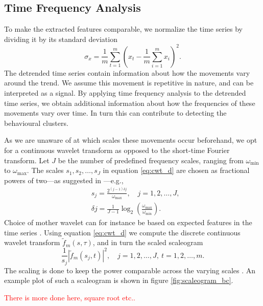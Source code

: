 \documentclass[a4paper]{memoir}
\theoremstyle{plain}
\theoremstyle{definition}
\theoremstyle{remark}
\begin{document}
\subsection{Time Frequency Analysis}
To make the extracted features comparable, we normalize the time series by dividing it by its standard deviation
\begin{equation*}
        \sigma_x = \frac{1}{m}\sum_{t = 1}^{m} \left( x_t - \frac{1}{m}\sum_{i = 1}^{m}x_i \right)^2.
\end{equation*}
The detrended time series contain information about how the movements vary around the trend.
We assume this movement is repetitive in nature, and can be interpreted as a signal.
By applying time frequency analysis to the detrended time series, we obtain additional information about how the frequencies of these movements vary over time.
In turn this can contribute to detecting the behavioural clusters.

As we are unaware of at which scales these movements occur beforehand, we opt for a continuous wavelet transform as opposed to the short-time Fourier transform.
Let $J$ be the number of predefined frequency scales, ranging from $\omega_{\text{min}}$ to $\omega_{\text{max}}$.
The scales $s_1, s_2, \hdots, s_J$ in equation \eqref{eq:cwt_d} are chosen as fractional powers of two—as suggested in \cite{torrence}—e.g.,
\begin{align*}
        &s_j = \frac{2^{(j - 1)\delta j}}{\omega_{\text{max}}}, \quad j = 1, 2, \hdots, J, \\
        & \delta j = \frac{1}{J - 1} \log_2 \left( \frac{\omega_{\text{max}}}{\omega_{\text{min}}} \right).
\end{align*}
Choice of mother wavelet can for instance be based on expected features in the time series \cite{torrence}.
Using equation \eqref{eq:cwt_d} we compute the discrete continuous wavelet transform $\tilde{f}_m(s, \tau)$, and in turn the scaled scaleogram
\begin{equation}\label{eq:s_spec}
       \frac{1}{s_j} \left|\tilde{f}_m(s_j, t) \right|^2, \quad j = 1, 2, \hdots, J, \ t = 1, 2, \hdots, m.
\end{equation}
The scaling is done to keep the power comparable across the varying scales \cite{liu}.
An example plot of such a scaleogram is shown in figure \ref{fig:scaleogram_bc}.

\textcolor{red}{There is more done here, square root etc..}
\end{document}
